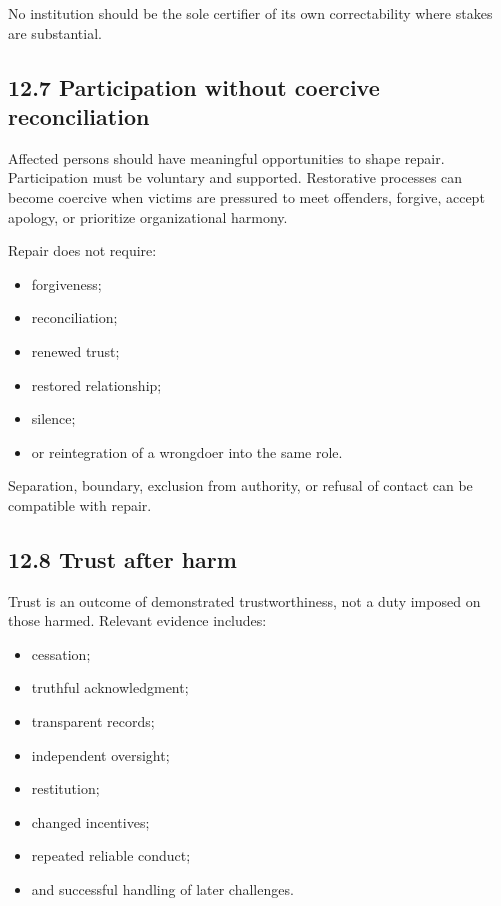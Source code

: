 \documentclass[
  11pt,
]{article}
\providecommand{\tightlist}{%
  \setlength{\itemsep}{0pt}\setlength{\parskip}{0pt}}
\begin{document}
No institution should be the sole certifier of its own correctability
where stakes are substantial.

\subsection{12.7 Participation without coercive
reconciliation}\label{participation-without-coercive-reconciliation}

Affected persons should have meaningful opportunities to shape repair.
Participation must be voluntary and supported. Restorative processes can
become coercive when victims are pressured to meet offenders, forgive,
accept apology, or prioritize organizational harmony.

Repair does not require:

\begin{itemize}
\tightlist
\item
  forgiveness;
\item
  reconciliation;
\item
  renewed trust;
\item
  restored relationship;
\item
  silence;
\item
  or reintegration of a wrongdoer into the same role.
\end{itemize}

Separation, boundary, exclusion from authority, or refusal of contact
can be compatible with repair.

\subsection{12.8 Trust after harm}\label{trust-after-harm}

Trust is an outcome of demonstrated trustworthiness, not a duty imposed
on those harmed. Relevant evidence includes:

\begin{itemize}
\tightlist
\item
  cessation;
\item
  truthful acknowledgment;
\item
  transparent records;
\item
  independent oversight;
\item
  restitution;
\item
  changed incentives;
\item
  repeated reliable conduct;
\item
  and successful handling of later challenges.
\end{itemize}
\end{document}

